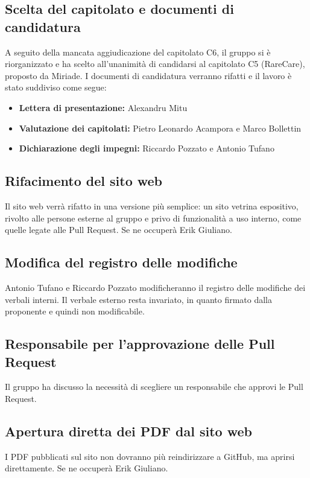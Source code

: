 \documentclass[a4paper, 11pt]{article}
\begin{document}
\subsection{Scelta del capitolato e documenti di candidatura}
A seguito della mancata aggiudicazione del capitolato C6, il gruppo si è riorganizzato e ha scelto all'unanimità di candidarsi al capitolato C5 (RareCare), proposto da Miriade. I documenti di candidatura verranno rifatti e il lavoro è stato suddiviso come segue:
\begin{itemize}
    \item \textbf{Lettera di presentazione:} Alexandru Mitu
    \item \textbf{Valutazione dei capitolati:} Pietro Leonardo Acampora e Marco Bollettin
    \item \textbf{Dichiarazione degli impegni:} Riccardo Pozzato e Antonio Tufano
\end{itemize}

\subsection{Rifacimento del sito web}
Il sito web verrà rifatto in una versione più semplice: un sito vetrina espositivo, rivolto alle persone esterne al gruppo e privo di funzionalità a uso interno, come quelle legate alle Pull Request. Se ne occuperà Erik Giuliano.

\subsection{Modifica del registro delle modifiche}
Antonio Tufano e Riccardo Pozzato modificheranno il registro delle modifiche dei verbali interni. Il verbale esterno resta invariato, in quanto firmato dalla proponente e quindi non modificabile.

\subsection{Responsabile per l'approvazione delle Pull Request}
Il gruppo ha discusso la necessità di scegliere un responsabile che approvi le Pull Request.

\subsection{Apertura diretta dei PDF dal sito web}
I PDF pubblicati sul sito non dovranno più reindirizzare a GitHub, ma aprirsi direttamente. Se ne occuperà Erik Giuliano.
\end{document}
